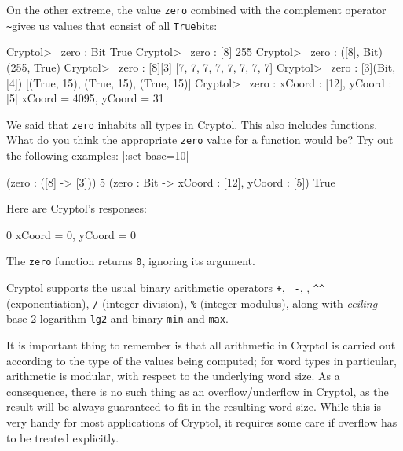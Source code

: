 \noindent On the other extreme, the value {\tt zero} combined with the
complement operator {\tt \Verb|~|}\indComplement gives us values that
consist of all {\tt True}\indTrue bits:
\begin{replPrompt}
  Cryptol> ~zero : Bit
  True
  Cryptol> ~zero : [8]
  255
  Cryptol> ~zero : ([8], Bit)
  (255, True)
  Cryptol> ~zero : [8][3]
  [7, 7, 7, 7, 7, 7, 7, 7]
  Cryptol> ~zero : [3](Bit, [4])
  [(True, 15), (True, 15), (True, 15)]
  Cryptol> ~zero : {xCoord : [12], yCoord : [5]}
  {xCoord = 4095, yCoord = 31}
\end{replPrompt}

\restartrepl
\begin{Exercise}\label{ex:zero:0}
  We said that {\tt zero} inhabits all types in Cryptol. This also
  includes functions. What do you think the appropriate {\tt zero}
  value for a function would be?  Try out the following examples:
\hidereplin|:set base=10|
\begin{replinVerb}
   (zero : ([8] -> [3])) 5
   (zero : Bit -> {xCoord : [12], yCoord : [5]}) True
\end{replinVerb}
\end{Exercise}
\begin{Answer}
Here are Cryptol's responses:\indZero
\begin{reploutVerb}
  0
  {xCoord = 0, yCoord = 0}
\end{reploutVerb}
The {\tt zero} function returns {\tt 0}, ignoring its argument.
\end{Answer}


Cryptol supports the usual binary arithmetic operators {\tt +}, {\tt
  -}, {\tt *}, {\tt \Verb|^^|} (exponentiation), {\tt /} (integer
division), {\tt \%} (integer modulus), along with \emph{ceiling}
base-2 logarithm {\tt lg2} and binary {\tt min} and {\tt max}.

It is important thing to remember is that all arithmetic in Cryptol is
carried out according to the type of the values being computed;
for word types in particular, arithmetic is modular,\indModular
with respect to the underlying word size.  As a
consequence, there is no such thing as an overflow/underflow in
Cryptol, as the result will be always guaranteed to fit in the
resulting word size.  While this is very handy for most applications of
Cryptol, it requires some care if overflow has to be treated
explicitly.\indOverflow\indUnderflow\indPlus\indMinus\indTimes\indDiv\indMod\indLg\indMin\indMax\indExponentiate

